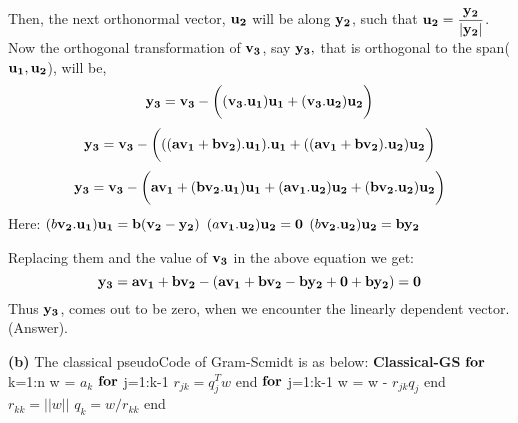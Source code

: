 \documentclass{article}
\renewcommand\part[1]{\vspace{.10in}\textbf{(#1)}}
\begin{document}
 Then, the next orthonormal vector, $\bf u_2$ will be along $\bf y_2$, such that $\bf u_2 = \dfrac{\bf y_2}{|\bf y_2|}$. \newline
 Now the orthogonal transformation of $\bf v_3$, say $\bf y_3, $ that is orthogonal to the span($\bf u_1, \bf u_2$), will be, \newline
 \[\bf y_3 = \bf v_3 - \bigg ( (\bf v_3 . \bf u_1)\bf u_1 + (\bf v_3 . \bf u_2)\bf u_2  \bigg )\]
 \[\bf y_3 = \bf v_3 - \bigg ( ((a\bf v_1 + b\bf v_2).\bf u_1).\bf u_1 + ((a\bf v_1 + b\bf v_2).\bf u_2)\bf u_2 \bigg )\]
 \[\bf y_3 = \bf v_3 - \bigg ( a\bf v_1 + (b\bf v_2.\bf u_1)\bf u_1 + (a\bf v_1.\bf u_2)\bf u_2 + (b\bf v_2.\bf u_2)\bf u_2 \bigg )\]
 Here: \newline
 $(b\bf v_2.\bf u_1)\bf u_1 = b(\bf v_2 - \bf y_2)$ \newline
 $(a\bf v_1.\bf u_2)\bf u_2 = 0$ \newline
 $(b\bf v_2.\bf u_2)\bf u_2 = b\bf y_2$ \newline

 Replacing them and the value of $\bf v_3$ in the above equation we get: \newline
 \[ \bf y_3 = a\bf v_1 + b\bf v_2 - ( a\bf v_1 + b\bf v_2 - b\bf y_2 + 0 + b\bf y_2 ) = 0\]
 Thus $\bf y_3$, comes out to be zero, when we encounter the linearly dependent vector. (Answer). \newline

 \part{b} The classical pseudoCode of Gram-Scmidt is as below: \newline
 \textbf {Classical-GS} \newline
 \hspace*{0.5cm} $\bf for$ k=1:n \newline
 \hspace*{1.0cm} w = $a_k$ \newline
 \hspace*{1.0cm} $\bf for$ j=1:k-1 \newline
 \hspace*{1.5cm} $r_{jk} = q_{j}^Tw$ \newline
 \hspace*{1.0cm} end \newline
 \hspace*{1.0cm} $\bf for$ j=1:k-1 \newline
 \hspace*{1.5cm} w = w - $r_{jk}q_j$ \newline
 \hspace*{1.0cm} end \newline
 \hspace*{1.0cm} $r_{kk} = ||w||$ \newline
 \hspace*{1.0cm} $q_{k} = w/r_{kk}$ \newline
 \hspace*{0.5cm} end \newline
\end{document}
